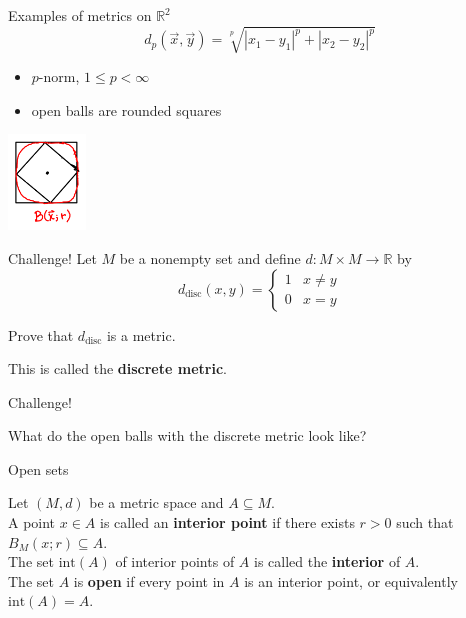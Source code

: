 \documentclass{beamer}
\begin{document}
\begin{frame}{Examples of metrics on $\mathbb{R}^2$}
$$d_p(\vec x,\vec y) = \sqrt[p]{|x_1-y_1|^p + |x_2-y_2|^p}$$
\begin{itemize}
\pause
\item $p$-norm, $1\leq p < \infty$
\pause
\item open balls are rounded squares
\end{itemize}
\pause
\begin{center}
\includegraphics[height=1in]{fig/ballp.png}
\end{center}
\end{frame}

\begin{frame}{Challenge!}
Let $M$ be a nonempty set and define $d: M\times M\rightarrow \mathbb{R}$ by
$$d_{\text{disc}}(x,y) = \left\lbrace\begin{array}{cc}
1 &  x\neq y\\
0 &  x = y
\end{array}\right.$$
\pause
\begin{prob}
Prove that $d_{\text{disc}}$ is a metric.
\end{prob}
\pause
This is called the \textbf{discrete metric}.
\end{frame}

\begin{frame}{Challenge!}
\begin{prob}
What do the open balls with the discrete metric look like?
\end{prob}
\end{frame}

\begin{frame}{Open sets}
\begin{defn}
\pause
Let $(M,d)$ be a metric space and $A\subseteq M$.\\
\pause
A point $x\in A$ is called an \textbf{interior point} if there exists $r>0$ such that $B_M(x;r)\subseteq A$.\\
\pause
The set $\text{int}(A)$ of interior points of $A$ is called the \textbf{interior} of $A$.\\
\pause
The set $A$ is \textbf{open} if every point in $A$ is an interior point, or equivalently $\text{int}(A) = A$.
\end{defn}
\end{frame}
\end{document}
